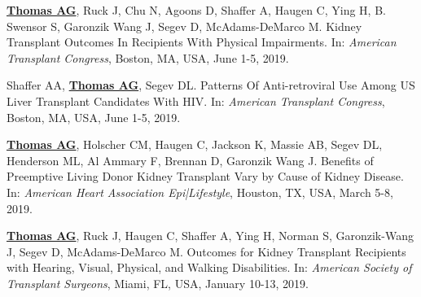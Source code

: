 \documentclass[10pt]{article}
\makeatletter
\newlength{\bibhang}
\newlength{\bibsep}
 {\@listi \global\bibsep\itemsep \global\advance\bibsep by\parsep}
\newenvironment{bibenum*}
  {\renewcommand\labelenumi{[\theenumi]}%
   \etaremune[
     topsep=0pt,
     itemsep=\bibsep,
     parsep=0pt,partopsep=0pt,
     itemindent=-\bibhang,
     leftmargin={\bibhang+\widthof{[999]}}]}
  {\endetaremune}
\makeatother
\begin{document}
\vspace{2mm}

\begin{bibenum*}

\item \underline{\textbf{Thomas AG}}, Ruck J, Chu N, Agoons D, Shaffer A,
  Haugen C, Ying H, B. Swensor S, Garonzik Wang J, Segev D, McAdams-DeMarco M.
  Kidney Transplant Outcomes In Recipients With Physical Impairments.
  In: \emph{American Transplant Congress},
  Boston, MA, USA, June 1-5, 2019.

\item Shaffer AA, \underline{\textbf{Thomas AG}}, Segev DL.
  Patterns Of Anti-retroviral Use Among US Liver Transplant
  Candidates With HIV.
  In: \emph{American Transplant Congress},
  Boston, MA, USA, June 1-5, 2019.

\item \underline{\textbf{Thomas AG}}, Holscher CM, Haugen C, Jackson K, Massie AB,
  Segev DL, Henderson ML, Al Ammary F, Brennan D, Garonzik Wang J.
  Benefits of Preemptive Living Donor Kidney Transplant Vary by
  Cause of Kidney Disease.
  In: \emph{American Heart Association Epi|Lifestyle},
  Houston, TX, USA, March 5-8, 2019.

\item \underline{\textbf{Thomas AG}}, Ruck J, Haugen C, Shaffer A, Ying H,
  Norman S, Garonzik-Wang J, Segev D, McAdams-DeMarco M.
  Outcomes for Kidney Transplant Recipients with Hearing, Visual,
  Physical, and Walking Disabilities.
  In: \emph{American Society of Transplant Surgeons},
  Miami, FL, USA, January 10-13, 2019.




\end{bibenum*}
\end{document}
